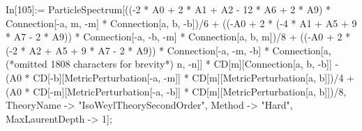 In[105]:= ParticleSpectrum[((-2 * A0 + 2 * A1 + A2 - 12 * A6 + 2 * A9) * Connection[-a, m, -m] * Connection[a, b, -b])/6 + ((-A0 + 2 * (-4 * A1 + A5 + 9 * A7 - 2 * A9)) * Connection[-a, -b, -m] * Connection[a, b, m])/8 + ((-A0 + 2 * (-2 * A2 + A5 + 9 * A7 - 2 * A9)) * Connection[-a, -m, -b] * Connection[a, (*omitted 1808 characters for brevity*) n, -n]] * CD[m][Connection[a, b, -b]] - (A0 * CD[-b][MetricPerturbation[-a, -m]] * CD[m][MetricPerturbation[a, b]])/4 + (A0 * CD[-m][MetricPerturbation[-a, -b]] * CD[m][MetricPerturbation[a, b]])/8, TheoryName -> "IsoWeylTheorySecondOrder", Method -> "Hard", MaxLaurentDepth -> 1];